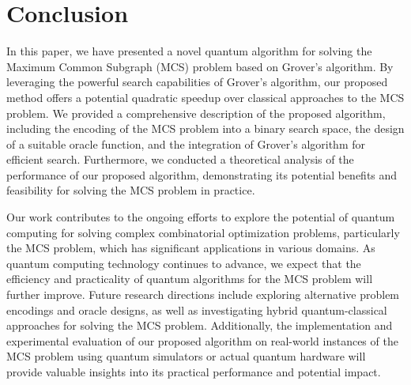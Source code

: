 \section{Conclusion}
\label{sec:conclusion}

In this paper, we have presented a novel quantum algorithm for solving the Maximum Common Subgraph (MCS) problem based on Grover's algorithm. By leveraging the powerful search capabilities of Grover's algorithm, our proposed method offers a potential quadratic speedup over classical approaches to the MCS problem. We provided a comprehensive description of the proposed algorithm, including the encoding of the MCS problem into a binary search space, the design of a suitable oracle function, and the integration of Grover's algorithm for efficient search. Furthermore, we conducted a theoretical analysis of the performance of our proposed algorithm, demonstrating its potential benefits and feasibility for solving the MCS problem in practice.

Our work contributes to the ongoing efforts to explore the potential of quantum computing for solving complex combinatorial optimization problems, particularly the MCS problem, which has significant applications in various domains. As quantum computing technology continues to advance, we expect that the efficiency and practicality of quantum algorithms for the MCS problem will further improve. Future research directions include exploring alternative problem encodings and oracle designs, as well as investigating hybrid quantum-classical approaches for solving the MCS problem. Additionally, the implementation and experimental evaluation of our proposed algorithm on real-world instances of the MCS problem using quantum simulators or actual quantum hardware will provide valuable insights into its practical performance and potential impact.


